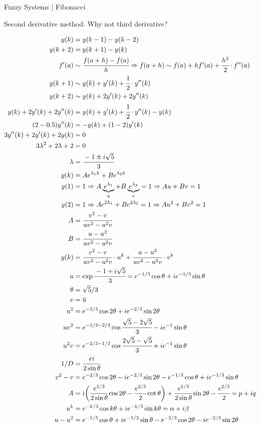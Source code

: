 \documentclass[11pt]{article}
\begin{document}
\Large

\begin{center}
Fuzzy Systems | Fibonacci
\end{center}

\normalsize

Second derivative method. Why not third derivative?

\begin{align}
y(k) &= y(k-1) - y(k-2) \\
y(k+2) &= y(k+1) - y(k) \\
f'(a) &\sim \cfrac{f(a + h) - f(a)}{h} \Rightarrow f(a + h) \sim f(a) + h f'(a) + \cfrac{h^2}{2}\cdot f''(a) \\
y(k + 1) &\sim y(k) + y'(k) + \cfrac{1}{2}\cdot y''(k) \\
y(k + 2) &\sim y(k) + 2 y'(k) + 2 y''(k) \\
y(k) + 2 y'(k) + 2 y''(k) &= y(k) + y'(k) + \cfrac{1}{2}\cdot y''(k) - y(k) \\
(2 - 0.5) y''(k) &= - y(k) + (1 - 2) y'(k) \\
3 y''(k) + 2 y'(k) + 2 y(k) &= 0 \\
3 \lambda^2 + 2 \lambda + 2 &= 0 \\
\lambda &= \cfrac{-1 \pm i \sqrt{5}}{3} \\
y(k) &= A e^{\lambda_1 k} + B e^{\lambda_2 k} \\
y(1) &= 1 \Rightarrow A \underbrace{e^{\lambda_1}}_u + B \underbrace{e^{\lambda_2}}_v = 1 \Rightarrow Au + Bv = 1 \\
y(2) &= 1 \Rightarrow A e^{2 \lambda_1} + B e^{2 \lambda_2} = 1 \Rightarrow Au^2 + Bv^2 = 1 \\
A &= \cfrac{v^2 - v}{uv^2 - u^2v} \\
B &= \cfrac{u - u^2}{uv^2 - u^2v} \\
y(k) &= \cfrac{v^2 - v}{uv^2 - u^2v} \cdot u^k + \cfrac{u - u^2}{uv^2 - u^2 v} \cdot v^k \\
  u &= \exp \cfrac{-1 + i \sqrt 5}{3} = e^{-1/3} \cos \theta + i e^{-1/3} \sin \theta \\
  \theta &= \sqrt 5 / 3 \\
  v &= \overline{u} \\
  u^2 &=  e^{-2/3} \cos 2\theta + i e^{-2/3} \sin 2\theta \\
  uv^2 &= e^{-1/3 - 2/3} \cos \cfrac{\sqrt 5 - 2 \sqrt 5}{3} - i e^{-1} \sin \theta \\
  u^2 v &=  e^{-2/3 - 1/3} \cos \cfrac{2 \sqrt 5 - \sqrt 5}{3} + i e^{-1} \sin \theta \\
1/D &= \cfrac{ei}{2 \sin \theta} \\
  v^2-v &= e^{-2/3} \cos 2\theta - i e^{-2/3} \sin 2\theta - e^{-1/3} \cos \theta + i e^{-1/3} \sin \theta \\
  A &= i \bigg(  \cfrac{e^{1/3}}{2 \sin \theta} \cos 2\theta   - \cfrac{e^{2/3}}{2} \cot \theta \bigg) + \cfrac{e^{1/3}}{2 \sin \theta} \sin 2\theta - \cfrac{ e^{2/3}}{2 } = p + iq \\
  u^k &= e^{-k/3} \cos k\theta + i e^{-k/3} \sin k\theta = \alpha + i \beta \\
u - u^2 &= e^{-1/3} \cos \theta + i e^{-1/3} \sin \theta -  e^{-2/3} \cos 2\theta - i e^{-2/3} \sin 2\theta
\end{align}
\end{document}
